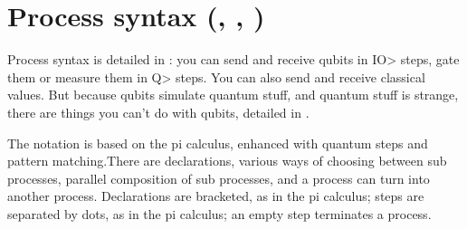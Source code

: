 \newcommand{\adot}{\;.\;}
\newcommand{\abar}{\;|\;}
\newcommand{\abang}{\;!\;}
\newcommand{\aquery}{\;?\;}
\section{Process syntax (, , )}

Process syntax is detailed in : you can send and receive qubits in \<IO> steps, gate them or measure them in \<Q> steps. You can also send and receive classical values. But because qubits simulate quantum stuff, and quantum stuff is strange, there are things you can't do with qubits, detailed in .

The notation is based on the pi calculus, enhanced with quantum steps and pattern matching.There are declarations, various ways of choosing between sub processes, parallel composition of sub processes, and a process can turn into another process. Declarations are bracketed, as in the pi calculus; steps are separated by dots, as in the pi calculus; an empty step terminates a process. 
